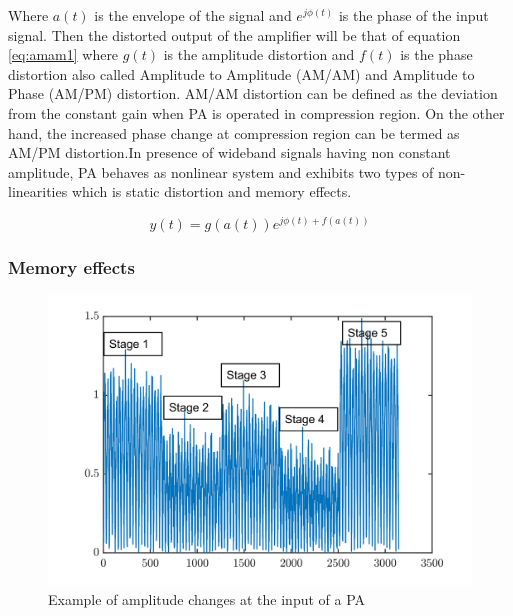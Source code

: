 Where $a(t)$ is the envelope of the signal and $e^{j\phi(t)}$ is the phase of the input signal. Then the distorted output of the amplifier will be that of equation \ref{eq:amam1} where $g(t)$ is the amplitude distortion and $f(t)$ is the phase distortion also called Amplitude to Amplitude (AM/AM) and Amplitude to Phase (AM/PM) distortion. AM/AM distortion can be defined as the deviation from the constant gain when PA is
operated in compression region. On the other hand, the increased phase change at compression
region can be termed as AM/PM distortion.In presence of wideband signals having non constant amplitude, PA behaves as nonlinear system and exhibits two types of non-linearities which is static distortion and memory effects.  

\begin{equation}\label{eq:amam2}
y(t) = g(a(t))e^{j\phi(t)+f(a(t))}
\end{equation}

\subsubsection{Memory effects}

\begin{figure}[H]
\centering 
\includegraphics[scale = 0.7]{figures/ch1/amplitude.png}
\caption{Example of amplitude changes at the input of a PA }
\label{fig:mem_amp}
\end{figure}


